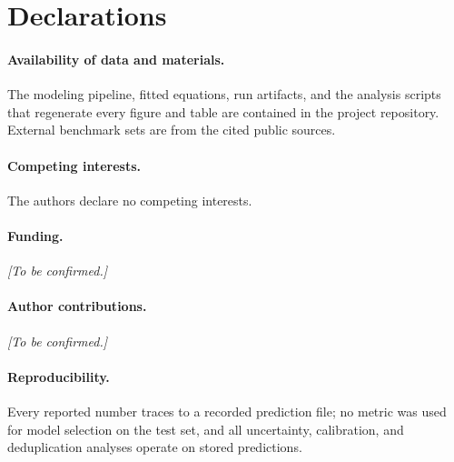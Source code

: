 \documentclass[11pt]{article}
\begin{document}
\section*{Declarations}

\paragraph{Availability of data and materials.} The modeling pipeline, fitted equations, run
artifacts, and the analysis scripts that regenerate every figure and table are contained in the
project repository. External benchmark sets are from the cited public sources.

\paragraph{Competing interests.} The authors declare no competing interests.

\paragraph{Funding.} \textit{[To be confirmed.]}

\paragraph{Author contributions.} \textit{[To be confirmed.]}

\paragraph{Reproducibility.} Every reported number traces to a recorded prediction file; no
metric was used for model selection on the test set, and all uncertainty, calibration, and
deduplication analyses operate on stored predictions.



\end{document}
